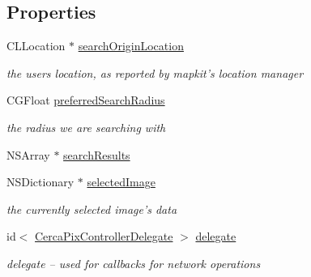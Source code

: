 \subsection*{Properties}
\begin{DoxyCompactItemize}
\item 
\hypertarget{interface_cerca_pix_controller_a8cefbd5b98894e0fc7884ea9ad13321d}{C\-L\-Location $\ast$ \hyperlink{interface_cerca_pix_controller_a8cefbd5b98894e0fc7884ea9ad13321d}{search\-Origin\-Location}}\label{interface_cerca_pix_controller_a8cefbd5b98894e0fc7884ea9ad13321d}

\begin{DoxyCompactList}\small\item\em the users location, as reported by mapkit's location manager \end{DoxyCompactList}\item 
\hypertarget{interface_cerca_pix_controller_a3114595396f6bc56ae5203d6a7f9505f}{C\-G\-Float \hyperlink{interface_cerca_pix_controller_a3114595396f6bc56ae5203d6a7f9505f}{preferred\-Search\-Radius}}\label{interface_cerca_pix_controller_a3114595396f6bc56ae5203d6a7f9505f}

\begin{DoxyCompactList}\small\item\em the radius we are searching with \end{DoxyCompactList}\item 
N\-S\-Array $\ast$ \hyperlink{interface_cerca_pix_controller_afb398c74c1d705d87150e563707f66d2}{search\-Results}
\item 
\hypertarget{interface_cerca_pix_controller_a622af71a9b0cdf3a1ac96575c64ff049}{N\-S\-Dictionary $\ast$ \hyperlink{interface_cerca_pix_controller_a622af71a9b0cdf3a1ac96575c64ff049}{selected\-Image}}\label{interface_cerca_pix_controller_a622af71a9b0cdf3a1ac96575c64ff049}

\begin{DoxyCompactList}\small\item\em the currently selected image's data \end{DoxyCompactList}\item 
\hypertarget{interface_cerca_pix_controller_a1f6f0c08a8df04e67184bf4fa8f65fad}{id$<$ \hyperlink{protocol_cerca_pix_controller_delegate-p}{Cerca\-Pix\-Controller\-Delegate} $>$ \hyperlink{interface_cerca_pix_controller_a1f6f0c08a8df04e67184bf4fa8f65fad}{delegate}}\label{interface_cerca_pix_controller_a1f6f0c08a8df04e67184bf4fa8f65fad}

\begin{DoxyCompactList}\small\item\em delegate -- used for callbacks for network operations \end{DoxyCompactList}\end{DoxyCompactItemize}


